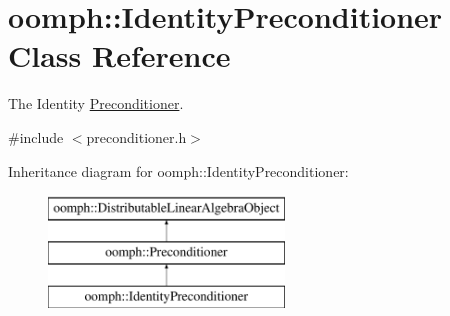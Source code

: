 \hypertarget{classoomph_1_1IdentityPreconditioner}{}\section{oomph\+:\+:Identity\+Preconditioner Class Reference}
\label{classoomph_1_1IdentityPreconditioner}


The Identity \hyperlink{classoomph_1_1Preconditioner}{Preconditioner}.  




{\ttfamily \#include $<$preconditioner.\+h$>$}

Inheritance diagram for oomph\+:\+:Identity\+Preconditioner\+:\begin{figure}[H]
\begin{center}
\leavevmode
\includegraphics[height=3.000000cm]{classoomph_1_1IdentityPreconditioner}
\end{center}
\end{figure}
